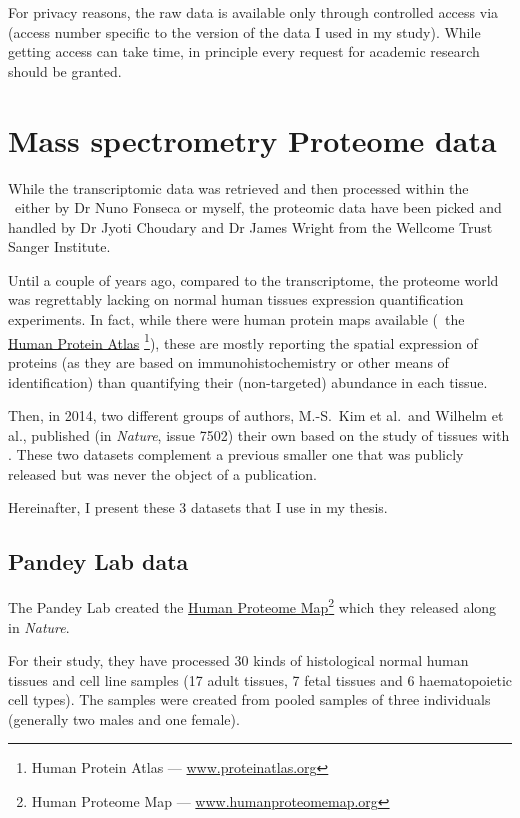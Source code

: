 For privacy reasons, the raw data is available only through controlled access via
 (access number specific to the version of the data I used
in my study). While getting access can take time, in principle every request for
academic research should be granted.

\section{Mass spectrometry Proteome data}\label{sec:ProteoData}

While the transcriptomic data was retrieved and then processed within the \EBI\
either by Dr Nuno Fonseca or myself, the proteomic data have been picked and
handled by Dr Jyoti Choudary and Dr James Wright from the Wellcome Trust
Sanger Institute.

Until a couple of years ago, compared to the transcriptome, the proteome world
was regrettably lacking on normal human tissues expression quantification
experiments. In fact, while there were human protein maps available
(\eg\ the \href{www.proteinatlas}{Human Protein Atlas}%
\footnote{Human Protein Atlas --- \href{http://www.proteinatlas.org}%
{www.proteinatlas.org}}), these
are mostly reporting the spatial expression of proteins (as they are based
on immunohistochemistry or other means of identification) than quantifying
their (non-targeted) abundance in each tissue.

Then, in 2014, two different groups of authors, M.-S.\ Kim et al.\
and Wilhelm et al., published (in \textit{Nature},
issue 7502) their own 
based on the study of tissues with \ms. These two datasets complement a previous
smaller one that was publicly released but was never the object of a publication.

Hereinafter, I present these 3 datasets that I use in my thesis.

\subsection{Pandey Lab data}

The Pandey Lab  created the
\href{http://www.humanproteomemap.org/}%
{Human Proteome Map}\footnote{Human Proteome Map --- %
\href{http://www.humanproteomemap.org/}{www.humanproteomemap.org}} which
they released along \paper{\citetitle{PandeyData}} in \emph{Nature}.

For their study, they have processed 30 kinds of histological normal human
tissues and cell line samples (17 adult tissues, 7 fetal tissues and 6
haematopoietic cell types). The samples were created from pooled samples of three
individuals (generally two males and one female).

